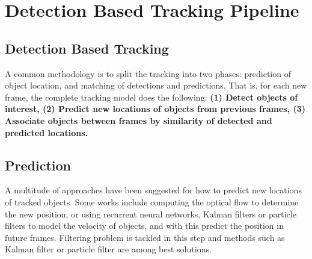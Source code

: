 \section{Detection Based Tracking Pipeline}
    \subsection{Detection Based Tracking}
        A common methodology is to split the tracking into two phases: prediction of object
        location, and matching of detections and predictions. That is, for each new frame,
        the complete tracking model does the following: \textbf{(1) Detect objects of interest, (2) Predict new locations of objects from previous frames, (3) Associate objects between frames
        by similarity of detected and predicted locations.}
    \subsection{Prediction}
        A multitude of approaches have been suggested for how to predict new locations of tracked objects. Some works include computing the optical flow to determine the new position, or using recurrent neural networks, Kalman filters or particle filters to 
        model the velocity of objects, and with this predict the position in future frames. Filtering problem is tackled in this step and methods such as Kalman filter or particle filter are among best solutions.
